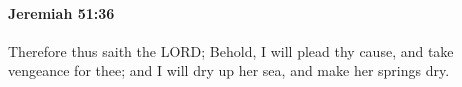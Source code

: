 
		\paragraph{Jeremiah 51:36} %
			\label{JEREMIAH-51-36}

			Therefore thus saith the LORD; Behold, I will plead thy cause, and take vengeance for thee; and I will dry up her sea, and make her springs dry.


